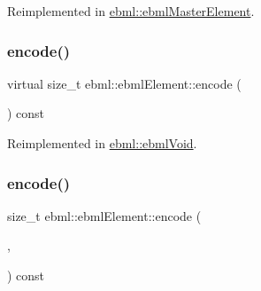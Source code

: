 Reimplemented in \mbox{\hyperlink{classebml_1_1ebmlMasterElement_ac0bc9d595746939fea3e30b810d89c9f}{ebml\+::ebml\+Master\+Element}}.

\mbox{\label{classebml_1_1ebmlElement_ad493e4103807b8d4434c0667c148dcea}} 
\subsubsection{\texorpdfstring{encode()}{encode()}\hspace{0.1cm}{\footnotesize\ttfamily [3/4]}}
{\footnotesize\ttfamily virtual size\+\_\+t ebml\+::ebml\+Element\+::encode (\begin{DoxyParamCaption}\item[{\mbox{\hyperlink{classebml_1_1ioBase}{io\+Base}} $\ast$}]{ }\end{DoxyParamCaption}) const\hspace{0.3cm}{\ttfamily [virtual]}}



Reimplemented in \mbox{\hyperlink{classebml_1_1ebmlVoid_ac822d7bf461ef44812596a34cccb134a}{ebml\+::ebml\+Void}}.

\mbox{\label{classebml_1_1ebmlElement_a90dcd3bd8e37160b21b9faed3cecd49c}} 
\subsubsection{\texorpdfstring{encode()}{encode()}\hspace{0.1cm}{\footnotesize\ttfamily [4/4]}}
{\footnotesize\ttfamily size\+\_\+t ebml\+::ebml\+Element\+::encode (\begin{DoxyParamCaption}\item[{char $\ast$}]{,  }\item[{size\+\_\+t}]{ }\end{DoxyParamCaption}) const}

\mbox{\label{classebml_1_1ebmlElement_a9a784c3c424216ecd4b320e2cfc713b2}} 
